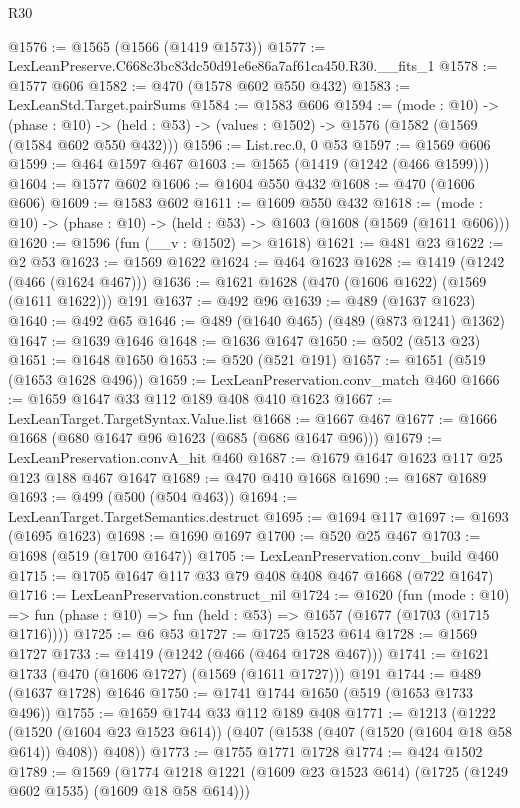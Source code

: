 \begin{lexlean}{R30}
\begin{coremodule}
@1576 := @1565 (@1566 (@1419 @1573))
@1577 := LexLeanPreserve.C668c3bc83dc50d91e6e86a7af61ca450.R30.__fits_1
@1578 := @1577 @606
@1582 := @470 (@1578 @602 @550 @432)
@1583 := LexLeanStd.Target.pairSums
@1584 := @1583 @606
@1594 := (mode : @10) ->
  (phase : @10) -> (held : @53) -> (values : @1502) -> @1576 (@1582 (@1569 (@1584 @602 @550 @432)))
@1596 := List.rec.{0, 0} @53
@1597 := @1569 @606
@1599 := @464 @1597 @467
@1603 := @1565 (@1419 (@1242 (@466 @1599)))
@1604 := @1577 @602
@1606 := @1604 @550 @432
@1608 := @470 (@1606 @606)
@1609 := @1583 @602
@1611 := @1609 @550 @432
@1618 := (mode : @10) -> (phase : @10) -> (held : @53) -> @1603 (@1608 (@1569 (@1611 @606)))
@1620 := @1596 (fun (__v : @1502) => @1618)
@1621 := @481 @23
@1622 := @2 @53
@1623 := @1569 @1622
@1624 := @464 @1623
@1628 := @1419 (@1242 (@466 (@1624 @467)))
@1636 := @1621 @1628 (@470 (@1606 @1622) (@1569 (@1611 @1622))) @191
@1637 := @492 @96
@1639 := @489 (@1637 @1623)
@1640 := @492 @65
@1646 := @489 (@1640 @465) (@489 (@873 @1241) @1362)
@1647 := @1639 @1646
@1648 := @1636 @1647
@1650 := @502 (@513 @23)
@1651 := @1648 @1650
@1653 := @520 (@521 @191)
@1657 := @1651 (@519 (@1653 @1628 @496))
@1659 := LexLeanPreservation.conv_match @460
@1666 := @1659 @1647 @33 @112 @189 @408 @410 @1623
@1667 := LexLeanTarget.TargetSyntax.Value.list
@1668 := @1667 @467
@1677 := @1666 @1668 (@680 @1647 @96 @1623 (@685 (@686 @1647 @96)))
@1679 := LexLeanPreservation.convA_hit @460
@1687 := @1679 @1647 @1623 @117 @25 @123 @188 @467 @1647
@1689 := @470 @410 @1668
@1690 := @1687 @1689
@1693 := @499 (@500 (@504 @463))
@1694 := LexLeanTarget.TargetSemantics.destruct
@1695 := @1694 @117
@1697 := @1693 (@1695 @1623)
@1698 := @1690 @1697
@1700 := @520 @25 @467
@1703 := @1698 (@519 (@1700 @1647))
@1705 := LexLeanPreservation.conv_build @460
@1715 := @1705 @1647 @117 @33 @79 @408 @408 @467 @1668 (@722 @1647)
@1716 := LexLeanPreservation.construct_nil
@1724 := @1620
    (fun (mode : @10) =>
    fun (phase : @10) => fun (held : @53) => @1657 (@1677 (@1703 (@1715 @1716))))
@1725 := @6 @53
@1727 := @1725 @1523 @614
@1728 := @1569 @1727
@1733 := @1419 (@1242 (@466 (@464 @1728 @467)))
@1741 := @1621 @1733 (@470 (@1606 @1727) (@1569 (@1611 @1727))) @191
@1744 := @489 (@1637 @1728) @1646
@1750 := @1741 @1744 @1650 (@519 (@1653 @1733 @496))
@1755 := @1659 @1744 @33 @112 @189 @408
@1771 := @1213
    (@1222
      (@1520 (@1604 @23 @1523 @614))
      (@407 (@1538 (@407 (@1520 (@1604 @18 @58 @614)) @408)) @408))
@1773 := @1755 @1771 @1728
@1774 := @424 @1502
@1789 := @1569
    (@1774 @1218 @1221 (@1609 @23 @1523 @614) (@1725 (@1249 @602 @1535) (@1609 @18 @58 @614)))

\end{coremodule}
\end{lexlean}
